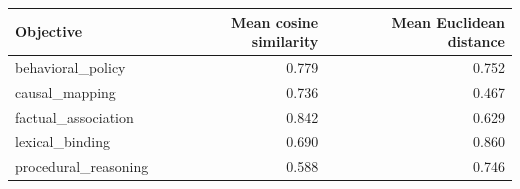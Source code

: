 \begin{tabular}{lrr}
\toprule
Objective & Mean cosine similarity & Mean Euclidean distance \\
\midrule
behavioral\_policy & 0.779 & 0.752 \\
causal\_mapping & 0.736 & 0.467 \\
factual\_association & 0.842 & 0.629 \\
lexical\_binding & 0.690 & 0.860 \\
procedural\_reasoning & 0.588 & 0.746 \\
\bottomrule
\end{tabular}
